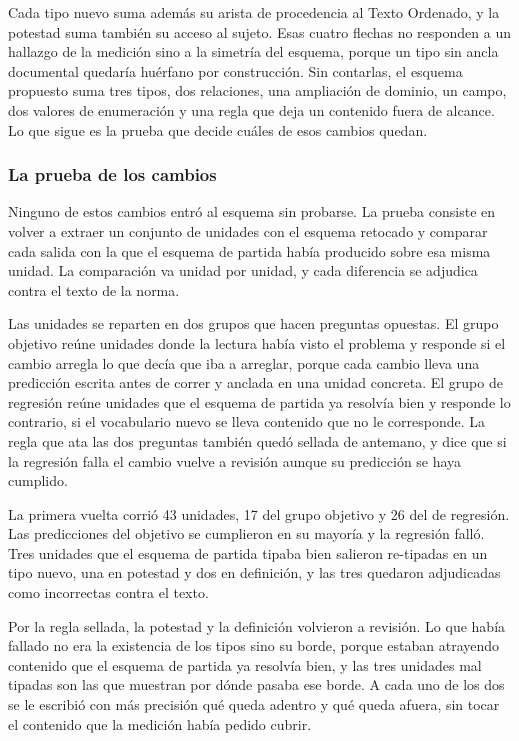 \documentclass[12pt,a4paper]{report}
\begin{document}
Cada tipo nuevo suma además su arista de procedencia al Texto Ordenado, y la potestad suma también su acceso al sujeto. Esas cuatro flechas no responden a un hallazgo de la medición sino a la simetría del esquema, porque un tipo sin ancla documental quedaría huérfano por construcción. Sin contarlas, el esquema propuesto suma tres tipos, dos relaciones, una ampliación de dominio, un campo, dos valores de enumeración y una regla que deja un contenido fuera de alcance. Lo que sigue es la prueba que decide cuáles de esos cambios quedan.

\subsubsection*{La prueba de los cambios}

Ninguno de estos cambios entró al esquema sin probarse. La prueba consiste en volver a extraer un conjunto de unidades con el esquema retocado y comparar cada salida con la que el esquema de partida había producido sobre esa misma unidad. La comparación va unidad por unidad, y cada diferencia se adjudica contra el texto de la norma.

Las unidades se reparten en dos grupos que hacen preguntas opuestas. El grupo objetivo reúne unidades donde la lectura había visto el problema y responde si el cambio arregla lo que decía que iba a arreglar, porque cada cambio lleva una predicción escrita antes de correr y anclada en una unidad concreta. El grupo de regresión reúne unidades que el esquema de partida ya resolvía bien y responde lo contrario, si el vocabulario nuevo se lleva contenido que no le corresponde. La regla que ata las dos preguntas también quedó sellada de antemano, y dice que si la regresión falla el cambio vuelve a revisión aunque su predicción se haya cumplido.

La primera vuelta corrió 43 unidades, 17 del grupo objetivo y 26 del de regresión. Las predicciones del objetivo se cumplieron en su mayoría y la regresión falló. Tres unidades que el esquema de partida tipaba bien salieron re-tipadas en un tipo nuevo, una en potestad y dos en definición, y las tres quedaron adjudicadas como incorrectas contra el texto.

Por la regla sellada, la potestad y la definición volvieron a revisión. Lo que había fallado no era la existencia de los tipos sino su borde, porque estaban atrayendo contenido que el esquema de partida ya resolvía bien, y las tres unidades mal tipadas son las que muestran por dónde pasaba ese borde. A cada uno de los dos se le escribió con más precisión qué queda adentro y qué queda afuera, sin tocar el contenido que la medición había pedido cubrir.
\end{document}
